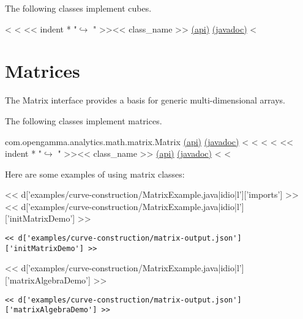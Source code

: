 The following classes implement cubes.

\begin{fullwidth}
<%
<%
<< indent * "$\hookrightarrow$ " >><< class_name >> \href{http://docs-static.opengamma.com/<< OG_VERSION >>/analytics/api/<< package_name >>.html#class-<<class_name>>}{(api)} \href{http://docs-static.opengamma.com/<< OG_VERSION >>/java/javadocs/<< class_name.replace(".","/") >>.html}{(javadoc)}
<%
\end{fullwidth}

\section{Matrices}

The Matrix interface provides a basis for generic multi-dimensional arrays.

The following classes implement matrices.

\begin{fullwidth}
com.opengamma.analytics.math.matrix.Matrix \href{http://docs-static.opengamma.com/<< OG_VERSION >>/analytics/api/com.opengamma.analytics.math.matrix.Matrix.html#class-com.opengamma.analytics.math.matrix.Matrix}{(api)} \href{http://docs-static.opengamma.com/<< OG_VERSION >>/analytics/javadoc/com/opengamma/math/matrix/Matrix}{(javadoc)}
<%
<%
<%
<%
<< indent * "$\hookrightarrow$ " >><< class_name >> \href{http://docs-static.opengamma.com/<< OG_VERSION >>/analytics/api/<< package_name >>.html#class-<<class_name>>}{(api)} \href{http://docs-static.opengamma.com/<< OG_VERSION >>/java/javadocs/<< class_name.replace(".","/") >>.html}{(javadoc)}
<%
<%

\end{fullwidth}


Here are some examples of using matrix classes:

<< d['examples/curve-construction/MatrixExample.java|idio|l']['imports'] >>
<< d['examples/curve-construction/MatrixExample.java|idio|l']['initMatrixDemo'] >>

\begin{Verbatim}
<< d['examples/curve-construction/matrix-output.json']['initMatrixDemo'] >>
\end{Verbatim}

<< d['examples/curve-construction/MatrixExample.java|idio|l']['matrixAlgebraDemo'] >>

\begin{Verbatim}
<< d['examples/curve-construction/matrix-output.json']['matrixAlgebraDemo'] >>
\end{Verbatim}
